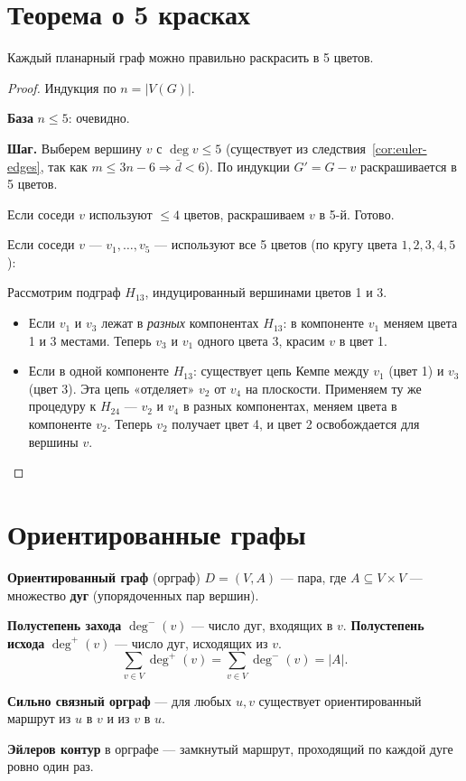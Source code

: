 \documentclass[12pt]{article}
\begin{document}
\section{Теорема о 5 красках}

\begin{theorem}
Каждый планарный граф можно правильно раскрасить в 5 цветов.
\end{theorem}

\begin{proof}
Индукция по $n = |V(G)|$.

\textbf{База} $n \leq 5$: очевидно.

\textbf{Шаг.} Выберем вершину $v$ с $\deg v \leq 5$ (существует из следствия~\ref{cor:euler-edges}, так как $m \leq 3n-6 \Rightarrow \bar{d} < 6$). По индукции $G' = G - v$ раскрашивается в 5 цветов.

Если соседи $v$ используют $\leq 4$ цветов, раскрашиваем $v$
в 5-й. Готово.

Если соседи $v$ --- $v_1,\ldots,v_5$ --- используют все 5 цветов
(по кругу цвета $1,2,3,4,5$):

Рассмотрим подграф $H_{13}$, индуцированный вершинами цветов 1 и 3.
\begin{itemize}
\item Если $v_1$ и $v_3$ лежат в \emph{разных} компонентах $H_{13}$:
      в компоненте $v_1$ меняем цвета 1 и 3 местами. Теперь $v_3$
      и $v_1$ одного цвета 3, красим $v$ в цвет 1.
\item Если в одной компоненте $H_{13}$: существует цепь Кемпе между
      $v_1$ (цвет 1) и $v_3$ (цвет 3). Эта цепь «отделяет»
      $v_2$ от $v_4$ на плоскости. Применяем ту же процедуру к $H_{24}$
      --- $v_2$ и $v_4$ в разных компонентах, меняем цвета в компоненте
      $v_2$. Теперь $v_2$ получает цвет 4, и цвет 2 освобождается
      для вершины $v$.
\end{itemize}
\end{proof}

\section{Ориентированные графы}

\begin{definition}
\textbf{Ориентированный граф} (орграф) $D = (V, A)$ --- пара,
где $A \subseteq V \times V$ --- множество \textbf{дуг}
(упорядоченных пар вершин).

\textbf{Полустепень захода} $\deg^-(v)$ --- число дуг, входящих в $v$.
\textbf{Полустепень исхода} $\deg^+(v)$ --- число дуг, исходящих из $v$.
\[
\sum_{v \in V} \deg^+(v) = \sum_{v \in V} \deg^-(v) = |A|.
\]

\textbf{Сильно связный орграф} --- для любых $u,v$ существует
ориентированный маршрут из $u$ в $v$ и из $v$ в $u$.

\textbf{Эйлеров контур} в орграфе --- замкнутый маршрут,
проходящий по каждой дуге ровно один раз.
\end{definition}
\end{document}

